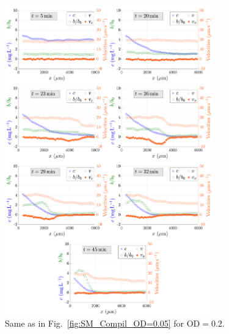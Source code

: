 \documentclass[aps,a4paper,twocolumn,10pt,pre,showpacs]{revtex4-2}
\begin{document}
\begin{figure}[ht]
\includegraphics[trim = 0mm 0mm 0mm 0mm, clip, width=0.8\textwidth, angle=0]{FigAE_03.pdf}
\caption{Same as in Fig.~\ref{fig:SM_Compil_OD=0.05} for $\mathrm{OD}=0.2$.}    
\label{fig:SM_Compil_OD=0.2}
\end{figure}
\end{document}
